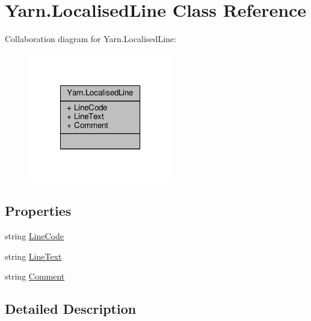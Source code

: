 \hypertarget{a00106}{\section{Yarn.\-Localised\-Line Class Reference}
\label{a00106}
}


Collaboration diagram for Yarn.\-Localised\-Line\-:
\nopagebreak
\begin{figure}[H]
\begin{center}
\leavevmode
\includegraphics[width=178pt]{d7/d84/a00535}
\end{center}
\end{figure}
\subsection*{Properties}
\begin{DoxyCompactItemize}
\item 
string \hyperlink{a00106_aad88f588cbbe2df9bb83da59eeff3d3c}{Line\-Code}
\item 
string \hyperlink{a00106_ab0b4fa82cfa7693ff3c96fe5c3837fff}{Line\-Text}
\item 
string \hyperlink{a00106_afbfb834bb1623653fa73945c221c4b9d}{Comment}
\end{DoxyCompactItemize}


\subsection{Detailed Description}


